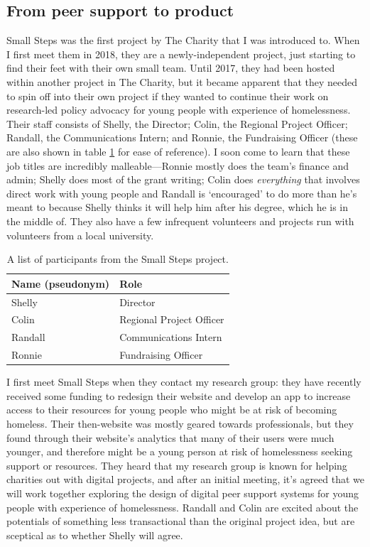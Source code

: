 \subsection{From peer support to product}
Small Steps was the first project by The Charity that I was introduced to. When I first meet them in 2018, they are a newly-independent project, just starting to find their feet with their own small team. Until 2017, they had been hosted within another project in The Charity, but it became apparent that they needed to spin off into their own project if they wanted to continue their work on research-led policy advocacy for young people with experience of homelessness. Their staff consists of Shelly, the Director; Colin, the Regional Project Officer; Randall, the Communications Intern; and Ronnie, the Fundraising Officer (these are also shown in table \ref{tab:small-steps-participants} for ease of reference). I soon come to learn that these job titles are incredibly malleable—Ronnie mostly does the team's finance and admin; Shelly does most of the grant writing; Colin does \textit{everything} that involves direct work with young people and Randall is `encouraged' to do more than he's meant to because Shelly thinks it will help him after his degree, which he is in the middle of. They also have a few infrequent volunteers and projects run with volunteers from a local university. 
\begin{table}[h!]
\centering
\begin{tabular}{|l|l|} \hline 
\textbf{Name (pseudonym)} & \textbf{Role}                    \\ \hline 
Shelly& Director\\ \hline 
Colin& Regional Project Officer\\ \hline 
Randall& Communications Intern\\ \hline 
Ronnie& Fundraising Officer\\\hline\end{tabular}

\caption{A list of participants from the Small Steps project.}
\label{tab:small-steps-participants}
\end{table}

I first meet Small Steps when they contact my research group: they have recently received some funding to redesign their website and develop an app to increase access to their resources for young people who might be at risk of becoming homeless. Their then-website was mostly geared towards professionals, but they found through their website's analytics that many of their users were much younger, and therefore might be a young person at risk of homelessness seeking support or resources. They heard that my research group is known for helping charities out with digital projects, and after an initial meeting, it's agreed that we will work together exploring the design of digital peer support systems for young people with experience of homelessness. Randall and Colin are excited about the potentials of something less transactional than the original project idea, but are sceptical as to whether Shelly will agree. 

